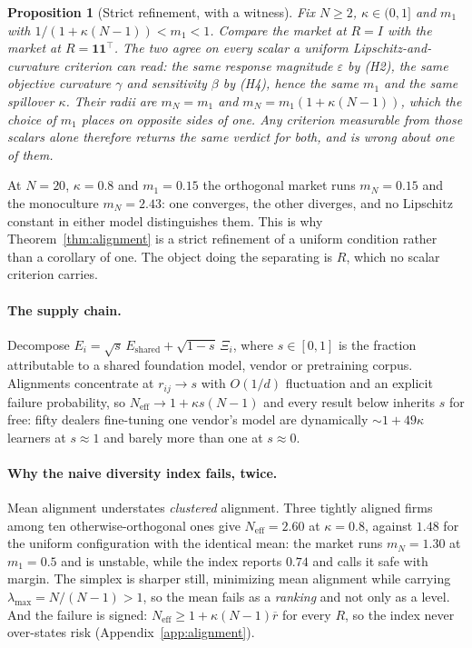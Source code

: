 \documentclass{article}
\theoremstyle{plain}
\newtheorem{proposition}[theorem]{Proposition}
\theoremstyle{definition}
\newcommand{\Neff}{N_{\mathrm{eff}}}
\newcommand{\mN}{m_N}
\newcommand{\lmax}{\lambda_{\max}}
\begin{document}
\begin{proposition}[Strict refinement, with a witness]
\label{prop:containment}
Fix $N \geq 2$, $\kappa \in (0,1]$ and $m_1$ with $1/(1+\kappa(N-1)) < m_1 < 1$. Compare the market at $R = I$ with the market at $R = \mathbf{1}\mathbf{1}^{\top}$. The two agree on every scalar a uniform Lipschitz-and-curvature criterion can read: the same response magnitude $\varepsilon$ by \textup{(H2)}, the same objective curvature $\gamma$ and sensitivity $\beta$ by \textup{(H4)}, hence the same $m_1$ and the same spillover $\kappa$. Their radii are $\mN = m_1$ and $\mN = m_1(1+\kappa(N-1))$, which the choice of $m_1$ places on opposite sides of one. Any criterion measurable from those scalars alone therefore returns the same verdict for both, and is wrong about one of them.
\end{proposition}

At $N=20$, $\kappa=0.8$ and $m_1 = 0.15$ the orthogonal market runs $\mN = 0.15$ and the monoculture $\mN = 2.43$: one converges, the other diverges, and no Lipschitz constant in either model distinguishes them. This is why Theorem~\ref{thm:alignment} is a strict refinement of a uniform condition rather than a corollary of one. The object doing the separating is $R$, which no scalar criterion carries.

\paragraph{The supply chain.}
Decompose $E_i = \sqrt{s}\,E_{\text{shared}} + \sqrt{1-s}\,\Xi_i$, where $s\in[0,1]$ is the fraction attributable to a shared foundation model, vendor or pretraining corpus. Alignments concentrate at $r_{ij}\to s$ with $O(1/d)$ fluctuation and an explicit failure probability, so $\Neff \to 1 + \kappa s (N-1)$ and every result below inherits $s$ for free: fifty dealers fine-tuning one vendor's model are dynamically ${\sim}1+49\kappa$ learners at $s\approx 1$ and barely more than one at $s \approx 0$.

\paragraph{Why the naive diversity index fails, twice.}
Mean alignment understates \emph{clustered} alignment. Three tightly aligned firms among ten otherwise-orthogonal ones give $\Neff = 2.60$ at $\kappa = 0.8$, against $1.48$ for the uniform configuration with the identical mean: the market runs $\mN = 1.30$ at $m_1 = 0.5$ and is unstable, while the index reports $0.74$ and calls it safe with margin. The simplex is sharper still, minimizing mean alignment while carrying $\lmax = N/(N-1) > 1$, so the mean fails as a \emph{ranking} and not only as a level. And the failure is signed: $\Neff \geq 1 + \kappa(N-1)\overline{r}$ for every $R$, so the index never over-states risk (Appendix~\ref{app:alignment}).
\end{document}
